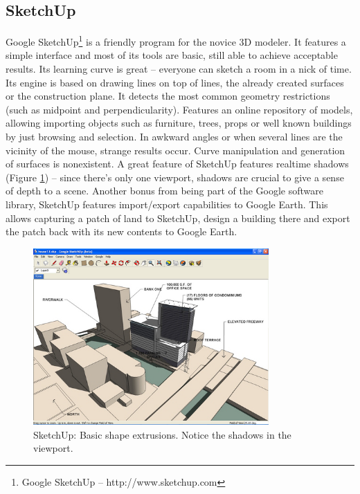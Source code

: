 \subsection{SketchUp}
\nocite{SITE-SKETCHUP}
Google SketchUp\footnote{Google SketchUp -- http://www.sketchup.com}
is a friendly program for the novice 3D modeler.
It features a simple interface and most of its tools are basic,
still able to achieve acceptable results.
Its learning curve is great -- everyone can sketch a room in a nick of time.
Its engine is based on drawing lines on top of lines,
the already created surfaces or the construction plane.
It detects the most common geometry restrictions (such as midpoint and perpendicularity).
Features an online repository of models, allowing importing objects such as furniture, trees, props or
well known buildings by just browsing and selection. In awkward angles or when several lines are the 
vicinity of the mouse, strange results occur.
Curve manipulation and generation of surfaces is nonexistent. A great feature of
SketchUp features realtime shadows (Figure \ref{FIG-SKETCHUP}) -- since there's only one viewport, shadows are crucial to
give a sense of depth to a scene. Another bonus from being part of the Google software
library, SketchUp features import/export capabilities to Google Earth. This allows capturing a patch of land
to SketchUp, design a building there and export the patch back with its new contents to Google Earth.

\begin{figure}[!ht]
    \centering
    \includegraphics[width=9cm]{gfx/sketchup-1.png}
    \caption{SketchUp: Basic shape extrusions. Notice the shadows in the viewport.}
    \label{FIG-SKETCHUP}
\end{figure}

